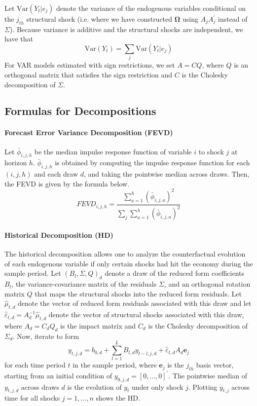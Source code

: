 \documentclass[12pt]{article}
\newcommand{\Var}{\mathrm{Var}}
\begin{document}
Let $\Var(Y_t | e_j)$ denote the variance of the endogenous variables conditional on the $j_{th}$ structural shock (i.e. where we have constructed $\mathbf{\Omega}$ using $A_jA_j^\prime$ instead of $\Sigma$). Because variance is additive and the structural shocks are independent, we have that
$$ \Var(Y_t) = \sum_j \Var(Y_t | e_j) $$
For VAR models estimated with sign restrictions, we set $A = CQ$, where $Q$ is an orthogonal matrix that satisfies the sign restriction and $C$ is the Cholesky decomposition of $\Sigma$.

\subsection{Formulas for Decompositions}

\paragraph{Forecast Error Variance Decomposition (FEVD)}

Let $\bar \phi_{i,j,h}$ be the median impulse response function of variable $i$ to shock $j$ at horizon $h$. $\bar \phi_{i,j,h}$ is obtained by computing the impulse response function for each $(i,j,h)$ and each draw $d$, and taking the pointwise median across draws. Then, the FEVD is given by the formula below.
\begin{equation}\label{app:eqn:fevd}
FEVD_{i,j,h} = \frac{\sum_{a = 1}^h (\bar \phi_{i,j,a})^2}{\sum_j \sum_{a = 1}^h (\bar \phi_{i,j,a})^2}
\end{equation} 

\paragraph{Historical Decomposition (HD)} The historical decomposition allows one to analyze the counterfactual evolution of each endogenous variable if only certain shocks had hit the economy during the sample period. Let $(B_l, \Sigma, Q)_d$ denote a draw of  the reduced form coefficients $B_l$, the variance-covariance matrix of the residuals $\Sigma$, and an orthogonal rotation matrix $Q$ that maps the structural shocks into the reduced form residuals. Let $\hat \mu_{t,d}$ denote the vector of reduced form residuals associated with this draw and let $\hat \varepsilon_{t,d} = A_d^{-1}\hat \mu_{t,d}$ denote the vector of structural shocks associated with this draw, where $A_d = C_d Q_d$ is the impact matrix and $C_d$ is the Cholesky decomposition of $\Sigma_d$. Now, iterate to form
$$ y_{t,j,d} = b_{0,d} + \sum_{l = 1}^L B_{l,d} y_{t-l,j,d} + \hat \varepsilon_{t,d} A_d \mathbf{e}_j $$
for each time period $t$ in the sample period, where $\mathbf{e}_j$ is the $j_{th}$ basis vector, starting from an initial condition of $y_{0,j,d} = [0, \dots, 0]^\prime$. The pointwise median of $ y_{t,j,d}$ across draws $d$ is the evolution of $y_t$ under only shock $j$. Plotting $y_{t,j}$ across time for all shocks $j = 1, \dots, n$ shows the HD.
\end{document}
